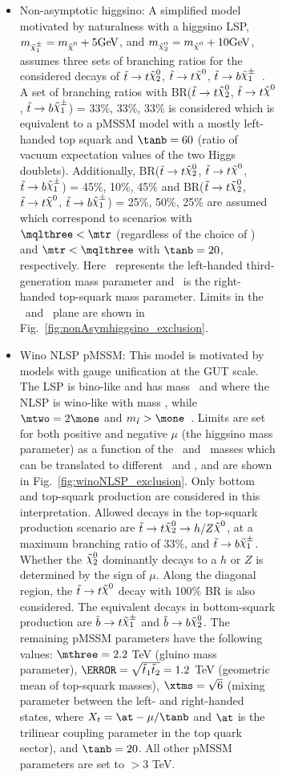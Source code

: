 \begin{figure}[htbp]
\begin{center}
\begin{figure}[htbp]
\begin{center}
{{{\begin{itemize}
	\item Non-asymptotic higgsino: A simplified model motivated by naturalness with a higgsino LSP, ${m_{\chinoonepm}=\mLSP+5\gev}$, and ${m_{\ninotwo}=\mLSP+10\gev}$, assumes three sets of branching ratios for the considered decays of $\stop\to t\ninotwo$, $\stop\to t\LSP$, $\stop\to b\chinoonepm$~\cite{naturalSUSY}. A set of branching ratios with BR($\stop\to t\ninotwo$, $\stop\to t\LSP$, $\stop\to b\chinoonepm$) = 33\%, 33\%, 33\% is considered which is equivalent to a pMSSM model with a mostly left-handed top squark and $\tanb=60$ (ratio of vacuum expectation values of the two Higgs doublets). Additionally, BR($\stop\to t\ninotwo$, $\stop\to t\LSP$, $\stop\to b\chinoonepm$) = 45\%, 10\%, 45\% and BR($\stop\to t\ninotwo$, $\stop\to t\LSP$, $\stop\to b\chinoonepm$) = 25\%, 50\%, 25\% are assumed which correspond to scenarios with $\mqlthree < \mtr$ (regardless of the choice of \tanb) and $\mtr<\mqlthree$ with $\tanb=20$, respectively. Here \mqlthree\ represents the left-handed third-generation mass parameter and \mtr\ is the right-handed top-squark mass parameter. Limits in the \mstop\ and \mLSP\ plane are shown in Fig.~\ref{fig:nonAsymhiggsino_exclusion}.  

	 \item Wino NLSP pMSSM: This model is motivated by models with gauge unification at the GUT scale. The LSP is bino-like and has mass \mone\ and where the NLSP is wino-like with mass \mtwo, while $\mtwo=2\mone$ and $\mstop>\mone$~\cite{naturalSUSY}. Limits are set for both positive and negative $\mu$ (the higgsino mass parameter) as a function of the \stop\ and \ninoone\ masses which can be translated to different \mone\ and \mqlthree, and are shown in Fig.~\ref{fig:winoNLSP_exclusion}. Only bottom and top-squark production are considered in this interpretation. Allowed decays in the top-squark production scenario are $\stop\to t \ninotwo\to h/Z \LSP$, at a maximum branching ratio of 33\%, and $\stop \to b \chinoonepm$. Whether the $\ninotwo$ dominantly decays to a $h$ or $Z$ is determined by the sign of $\mu$. Along the diagonal region, the $\stop\to t\LSP$ decay with 100\% BR is also considered. The equivalent decays in bottom-squark production are $\sbottom\to t\chinoonepm$ and $\sbottom\to b\ninotwo$. The remaining pMSSM parameters have the following values: $\mthree=2.2$ TeV (gluino mass parameter), $\ms=\sqrt{\stopone\stoptwo}=1.2$ TeV (geometric mean of top-squark masses), $\xtms=\sqrt{6}$ (mixing parameter between the left- and right-handed states, where $X_{t}=\at-\mu/\tanb$ and $\at$ is the trilinear coupling parameter in the top quark sector), and $\tanb=20$. All other pMSSM parameters are set to $>$3 TeV. 


\end{itemize}}}}
\end{center}
\end{figure}
\end{center}
\end{figure}
